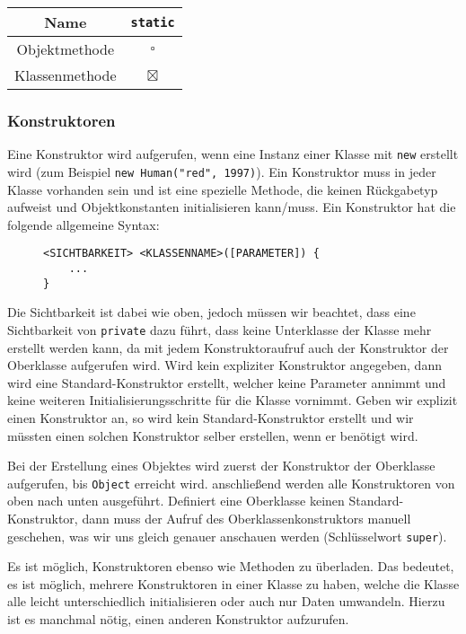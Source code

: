 		\begin{table}[H]
			\centering
			\begin{tabular}{c | c}
				\textbf{Name}  & \lstinline|static| \\ \hline
				Objektmethode  & \(\square\)        \\
				Klassenmethode & \(\boxtimes\)
			\end{tabular}
		\end{table}
	
	\subsubsection{Konstruktoren}
		\label{sec:constructor}
	
		Eine Konstruktor wird aufgerufen, wenn eine Instanz einer Klasse mit \lstinline|new| erstellt wird (zum Beispiel \lstinline|new Human("red", 1997)|). Ein Konstruktor muss in jeder Klasse vorhanden sein und ist eine spezielle Methode, die keinen Rückgabetyp aufweist und Objektkonstanten initialisieren kann/muss. Ein Konstruktor hat die folgende allgemeine Syntax:
		\begin{figure}[H]
			\centering
			\begin{lstlisting}
<SICHTBARKEIT> <KLASSENNAME>([PARAMETER]) {
	...
}
\end{lstlisting}
		\end{figure}
		Die Sichtbarkeit ist dabei wie oben, jedoch müssen wir beachtet, dass eine Sichtbarkeit von \lstinline|private| dazu führt, dass keine Unterklasse der Klasse mehr erstellt werden kann, da mit jedem Konstruktoraufruf auch der Konstruktor der Oberklasse aufgerufen wird. Wird kein expliziter Konstruktor angegeben, dann wird eine Standard-Konstruktor erstellt, welcher keine Parameter annimmt und keine weiteren Initialisierungsschritte für die Klasse vornimmt. Geben wir explizit einen Konstruktor an, so wird kein Standard-Konstruktor erstellt und wir müssten einen solchen Konstruktor selber erstellen, wenn er benötigt wird.
		
		Bei der Erstellung eines Objektes wird zuerst der Konstruktor der Oberklasse aufgerufen, bis \lstinline|Object| erreicht wird. anschließend werden alle Konstruktoren von oben nach unten ausgeführt. Definiert eine Oberklasse keinen Standard-Konstruktor, dann muss der Aufruf des Oberklassenkonstruktors manuell geschehen, was wir uns gleich genauer anschauen werden (Schlüsselwort \lstinline|super|).
		
		Es ist möglich, Konstruktoren ebenso wie Methoden zu überladen. Das bedeutet, es ist möglich, mehrere Konstruktoren in einer Klasse zu haben, welche die Klasse alle leicht unterschiedlich initialisieren oder auch nur Daten umwandeln. Hierzu ist es manchmal nötig, einen anderen Konstruktor aufzurufen.
		
